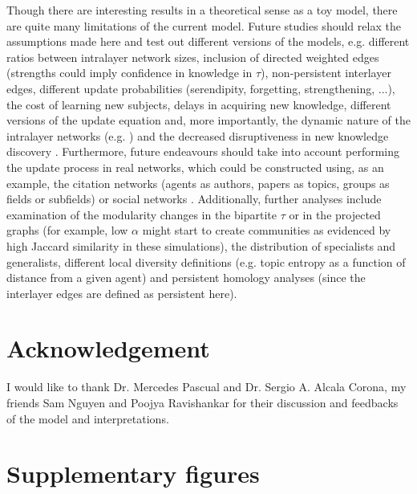 \documentclass{svproc}
\begin{document}
Though there are interesting results in a theoretical sense as a toy model, there are quite many limitations of the current model. Future studies should relax the assumptions made here and test out different versions of the models, e.g. different ratios between intralayer network sizes, inclusion of directed weighted edges (strengths could imply confidence in knowledge in $\tau$), non-persistent interlayer edges, different update probabilities (serendipity, forgetting, strengthening, ...), the cost of learning new subjects, delays in acquiring new knowledge, different versions of the update equation and, more importantly, the dynamic nature of the intralayer networks (e.g. \cite{Sun2020-qj}) and the decreased disruptiveness in new knowledge discovery \cite{Park2021-jb}. Furthermore, future endeavours should take into account performing the update process in real networks, which could be constructed using, as an example, the citation networks (agents as authors, papers as topics, groups as fields or subfields) or social networks \cite{Weng2015-zt}. Additionally, further analyses include examination of the modularity changes in the bipartite $\tau$ \cite{Dankulov2015-uv} or in the projected graphs (for example, low $\alpha$ might start to create communities as evidenced by high Jaccard similarity in these simulations), the distribution of specialists and generalists, different local diversity definitions (e.g. topic entropy as a function of distance from a given agent) and persistent homology analyses (since the interlayer edges are defined as persistent here).

\section{Acknowledgement}

I would like to thank Dr. Mercedes Pascual and Dr. Sergio A. Alcala Corona, my friends Sam Nguyen and Poojya Ravishankar for their discussion and feedbacks of the model and interpretations.




\vspace{-1em}

\section*{Supplementary figures}

\setcounter{figure}{0}
\renewcommand{\thefigure}{S\arabic{figure}}
\end{document}
